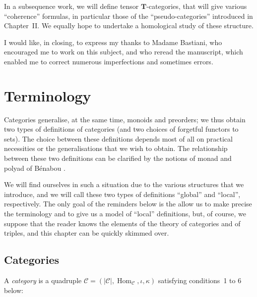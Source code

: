 \documentclass{article}
\newcommand{\oldpage}[1]{\marginpar{\footnotesize$\Big\vert$ \textit{p.~#1}}}
\newcommand{\TT}{\mathbf{T}}
\newcommand{\cat}[1]{\mathcal{#1}}
\newcommand{\set}[1]{|#1|}
\DeclareMathOperator{\Hom}{Hom}
\begin{document}
In a subsequence work, we will define tensor $\TT$-categories, that will give various ``coherence'' formulas, in particular those of the ``pseudo-categories'' introduced in Chapter~II.
We equally hope to undertake a homological study of these structure.

I would like, in closing, to express my thanks to Madame Bastiani, who encouraged me to work on this subject, and who reread the manuscript, which enabled me to correct numerous imperfections and sometimes errors.





\clearpage
\tableofcontents


\clearpage
\setcounter{section}{-1}
\section{Terminology}

\oldpage{219}

Categories generalise, at the same time, monoids and preorders;
we thus obtain two types of definitions of categories (and two choices of forgetful functors to sets).
The choice between these definitions depends most of all on practical necessities or the generalisations that we wish to obtain.
The relationship between these two definitions can be clarified by the notions of monad and polyad of Bénabou \cite{Be}.

We will find ourselves in such a situation due to the various structures that we introduce, and we will call these two types of definitions ``global'' and ``local'', respectively.
The only goal of the reminders below is the allow us to make precise the terminology and to give us a model of ``local'' definitions, but, of course, we suppose that the reader knows the elements of the theory of categories and of triples, and this chapter can be quickly skimmed over.


\subsection{Categories}

A \emph{category} is a quadruple $\cat{C}=(\set{\cat{C}}, \Hom_\cat{C}, \iota, \kappa)$ satisfying conditions~1 to 6 below:
\end{document}
